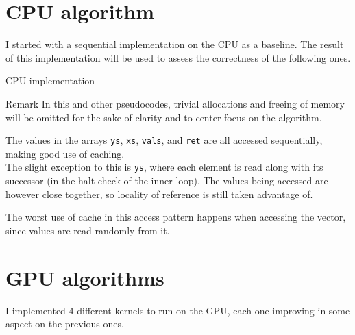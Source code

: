\documentclass{article}
\begin{document}
\section{CPU algorithm}
I started with a sequential implementation on the CPU as a baseline. The result of this implementation will be used to assess the correctness of the following ones.
\newcommand\commentFont[1]{\ttfamily\textcolor{blue}{#1}}
\begin{algorithm}[ht]
    \label{algo:CPU}
    \caption{CPU implementation}
\end{algorithm}
\begin{callout}{Remark}
    In this and other pseudocodes, trivial allocations and freeing of memory will be omitted for the sake of clarity and to center focus on the algorithm.
\end{callout}
The values in the arrays \texttt{ys}, \texttt{xs}, \texttt{vals}, and \texttt{ret} are all accessed sequentially, making good use of caching.\\
The slight exception to this is \texttt{ys}, where each element is read along with its successor (in the halt check of the inner loop). The values being accessed are however close together, so locality of reference is still taken advantage of.

The worst use of cache in this access pattern happens when accessing the vector, since values are read randomly from it.

\section{GPU algorithms}
I implemented 4 different kernels to run on the GPU, each one improving in some aspect on the previous ones.
\end{document}
